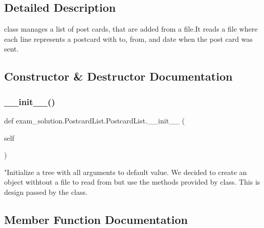 \subsection{Detailed Description}
\begin{DoxyVerb} class manages a list of post cards, that are added from a file.It
 reads a file where each line represents a postcard with to, from,
 and date when the post card was sent.
\end{DoxyVerb}
 

\subsection{Constructor \& Destructor Documentation}
\mbox{\label{classexam__solution_1_1PostcardList_1_1PostcardList_a8a5134beb17641cbdc5c67be97cf0312}} 
\subsubsection{\texorpdfstring{\_\_init\_\_()}{\_\_init\_\_()}}
{\footnotesize\ttfamily def exam\+\_\+solution.\+Postcard\+List.\+Postcard\+List.\+\_\+\+\_\+init\+\_\+\+\_\+ (\begin{DoxyParamCaption}\item[{}]{self }\end{DoxyParamCaption})}

\begin{DoxyVerb}"Initialize a tree with all arguments to default
value. We decided to create an object withtout a file to
read from but use the methods provided by class. This is
design passed by the class.\end{DoxyVerb}
 

\subsection{Member Function Documentation}
\mbox{\label{classexam__solution_1_1PostcardList_1_1PostcardList_af8499fa67fcf60709c791f8fcfed4004}} 
